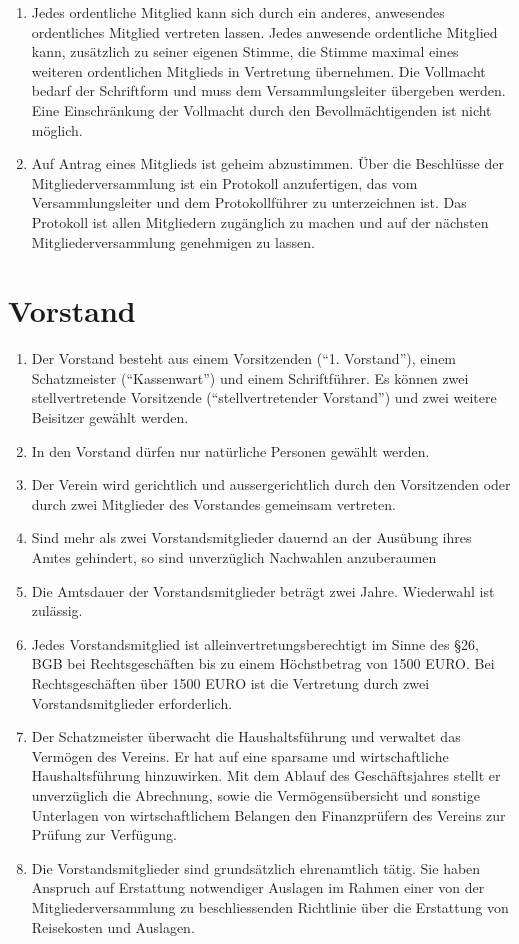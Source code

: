 \documentclass[a4paper, 12pt]{scrartcl}
\begin{document}
\begin{enumerate}
	  \item Jedes ordentliche Mitglied kann sich durch ein anderes, anwesendes ordentliches Mitglied vertreten lassen. Jedes anwesende ordentliche Mitglied kann, zusätzlich zu seiner eigenen Stimme, die Stimme maximal eines weiteren ordentlichen Mitglieds in Vertretung übernehmen. Die Vollmacht bedarf der Schriftform und muss dem Versammlungsleiter übergeben werden. Eine Einschränkung der Vollmacht durch den Bevollmächtigenden ist nicht möglich.
	  \item Auf Antrag eines Mitglieds ist geheim abzustimmen. Über die Beschlüsse der Mitgliederversammlung ist ein Protokoll anzufertigen, das vom Versammlungsleiter und dem Protokollführer zu unterzeichnen ist. Das Protokoll ist allen Mitgliedern zugänglich zu machen und auf der nächsten Mitgliederversammlung genehmigen zu lassen.
     \end{enumerate}

\section{Vorstand}
     \begin{enumerate}
	  \item Der Vorstand besteht aus einem Vorsitzenden (“1. Vorstand”), einem Schatzmeister (“Kassenwart”) und einem Schriftführer. Es können zwei stellvertretende Vorsitzende (“stellvertretender Vorstand”) und zwei weitere Beisitzer gewählt werden.  
	  \item In den Vorstand dürfen nur natürliche Personen gewählt werden.  
	  \item Der Verein wird gerichtlich und aussergerichtlich durch den Vorsitzenden oder durch zwei Mitglieder des Vorstandes gemeinsam vertreten.  
	  \item Sind mehr als zwei Vorstandsmitglieder dauernd an der Ausübung ihres Amtes gehindert, so sind unverzüglich Nachwahlen anzuberaumen  
	  \item Die Amtsdauer der Vorstandsmitglieder beträgt zwei Jahre. Wiederwahl ist zulässig.  
	  \item Jedes Vorstandsmitglied ist alleinvertretungsberechtigt im Sinne des §26, BGB bei Rechtsgeschäften bis zu einem Höchstbetrag von 1500 EURO. Bei Rechtsgeschäften über 1500 EURO ist die Vertretung durch zwei Vorstandsmitglieder erforderlich.  
	  \item Der Schatzmeister überwacht die Haushaltsführung und verwaltet das Vermögen des Vereins. Er hat auf eine sparsame und wirtschaftliche Haushaltsführung hinzuwirken. Mit dem Ablauf des Geschäftsjahres stellt er unverzüglich die Abrechnung, sowie die Vermögensübersicht und sonstige Unterlagen von wirtschaftlichem Belangen den Finanzprüfern des Vereins zur Prüfung zur Verfügung.  
	  \item Die Vorstandsmitglieder sind grundsätzlich ehrenamtlich tätig. Sie haben Anspruch auf Erstattung notwendiger Auslagen im Rahmen einer von der Mitgliederversammlung zu beschliessenden Richtlinie über die Erstattung von Reisekosten und Auslagen.  
     \end{enumerate}
\end{document}
